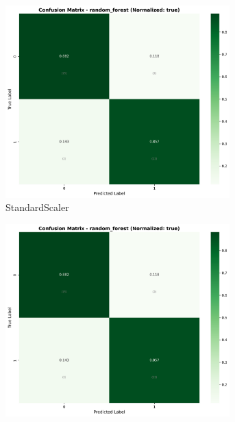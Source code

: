 \begin{figure}[H]
\centering
\begin{subfigure}[b]{0.31\textwidth}
\centering
\includegraphics[width=0.95\textwidth]{Result/cleveland_dataset/confusion_matrices/random_forest_numeric_dataset_StandardScaler.png}
\caption{StandardScaler}
\label{fig:rf_clev_cm_standard}
\end{subfigure}\hfill
\begin{subfigure}[b]{0.31\textwidth}
\centering
\includegraphics[width=0.95\textwidth]{Result/cleveland_dataset/confusion_matrices/random_forest_numeric_dataset_MinMaxScaler.png}

\end{subfigure}
\end{figure}
